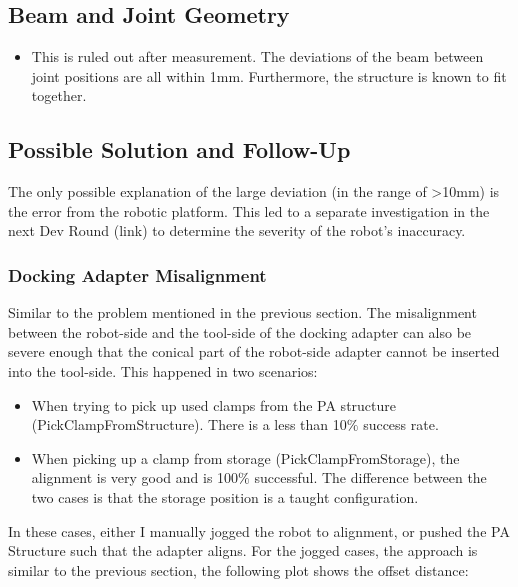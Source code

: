 \documentclass[11pt]{book}
\begin{document}
\subsection{Beam and Joint Geometry}

\begin{itemize}
\begin{itemize}
	\item This is ruled out after measurement. The deviations of the beam between joint positions are all within 1mm. Furthermore, the structure is known to fit together.

\end{itemize}
\end{itemize}
\subsection{Possible Solution and Follow-Up}

The only possible explanation of the large deviation (in the range of >10mm) is the error from the robotic platform. This led to a separate investigation in the next Dev Round (link) to determine the severity of the robot’s inaccuracy.

\subsubsection{Docking Adapter Misalignment}

Similar to the problem mentioned in the previous section. The misalignment between the robot-side and the tool-side of the docking adapter can also be severe enough that the conical part of the robot-side adapter cannot be inserted into the tool-side. This happened in two scenarios:

\begin{itemize}
	\item When trying to pick up used clamps from the PA structure (PickClampFromStructure). There is a less than 10$\%$ success rate.

	\item When picking up a clamp from storage (PickClampFromStorage), the alignment is very good and is 100$\%$ successful. The difference between the two cases is that the storage position is a taught configuration.

\end{itemize}
In these cases, either I manually jogged the robot to alignment, or pushed the PA Structure such that the adapter aligns. For the jogged cases, the approach is similar to the previous section, the following plot shows the offset distance:
\end{document}
